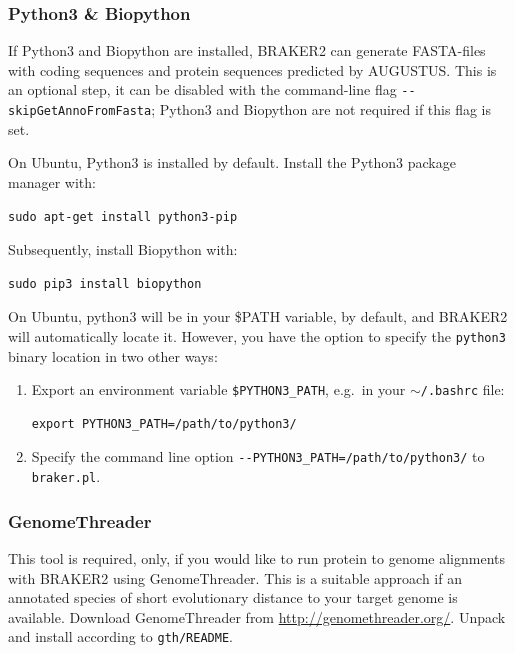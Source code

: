 \documentclass[a4paper,10pt]{report}
\begin{document}
\subsubsection{Python3 \& Biopython}

If Python3 and Biopython are installed, BRAKER2 can generate FASTA-files with coding sequences and protein sequences predicted by AUGUSTUS. This is an optional step, it can be disabled with the command-line flag \texttt{-{}-skipGetAnnoFromFasta}; Python3 and Biopython are not required if this flag is set.

On Ubuntu, Python3 is installed by default. Install the Python3 package manager with:

\begin{verbatim}
sudo apt-get install python3-pip
\end{verbatim}

Subsequently, install Biopython with:

\begin{verbatim}
sudo pip3 install biopython
\end{verbatim}

On Ubuntu, python3 will be in your \$PATH variable, by default, and BRAKER2 will automatically locate it. However, you have the option to specify the \texttt{python3} binary location in two other ways:

\begin{enumerate}
\item Export an environment variable \texttt{\$PYTHON3\_PATH}, e.g.~in your \texttt{$\sim$/.bashrc} file:
\begin{verbatim}
export PYTHON3_PATH=/path/to/python3/
\end{verbatim}
\item Specify the command line option \texttt{-{}-PYTHON3\_PATH=/path/to/python3/} to \texttt{braker.pl}.
\end{enumerate}


\subsubsection{GenomeThreader}

This tool is required, only, if you would like to run protein to genome alignments with BRAKER2 using GenomeThreader. This is a suitable approach if an annotated species of short evolutionary distance to your target genome is available. Download GenomeThreader from \url{http://genomethreader.org/}. Unpack and install according to \texttt{gth/README}.
\end{document}
